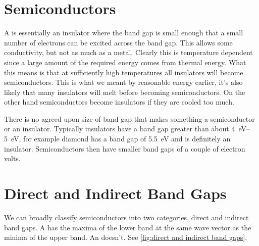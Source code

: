 \documentclass[fleqn]{NotesClass}
\begin{document}
    \section{Semiconductors}
    A  is essentially an insulator where the band gap is small enough that a small number of electrons can be excited across the band gap.
    This allows some conductivity, but not as much as a metal.
    Clearly this is temperature dependent since a large amount of the required energy comes from thermal energy.
    What this means is that at sufficiently high temperatures all insulators will become semiconductors.
    This is what we meant by reasonable energy earlier, it's also likely that many insulators will melt before becoming semiconductors.
    On the other hand semiconductors become insulators if they are cooled too much.
    
    There is no agreed upon size of band gap that makes something a semiconductor or an insulator.
    Typically insulators have a band gap greater than about \qtyrange{4}{5}{\electronvolt}, for example diamond has a band gap of \qty{5.5}{\electronvolt} and is definitely an insulator.
    Semiconductors then have smaller band gaps of a couple of electron volts.
    
    \section{Direct and Indirect Band Gaps}
    We can broadly classify semiconductors into two categories, direct and indirect band gaps.
    A  has the maxima of the lower band at the same wave vector as the minima of the upper band.
    An  doesn't.
    See \cref{fig:direct and indirect band gaps}.
    
\end{document}
